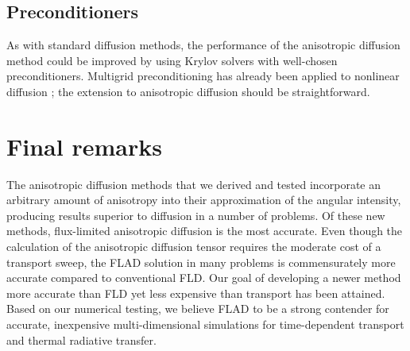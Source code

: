 \subsection{Preconditioners}

As with standard diffusion methods, the performance of the anisotropic diffusion method could be improved
by using Krylov solvers with well-chosen preconditioners. Multigrid
preconditioning has already been applied to nonlinear diffusion
\cite{Rid1999,Mou2006};
the extension to anisotropic diffusion should be straightforward.

\section{Final remarks}

The anisotropic diffusion methods that we derived and tested incorporate an
arbitrary amount of anisotropy into their approximation of the angular
intensity, producing results superior to diffusion in a number of problems. Of
these new methods, flux-limited anisotropic diffusion is the most accurate.
Even though the calculation of the anisotropic diffusion tensor
requires the moderate cost of a transport sweep, the FLAD solution in many
problems is commensurately more accurate compared to conventional FLD. Our
goal of developing a newer method more accurate than FLD yet less expensive
than transport has been attained. Based on
our numerical testing, we believe FLAD to be a strong contender for
accurate, inexpensive multi-dimensional simulations for time-dependent
transport and thermal radiative transfer.

